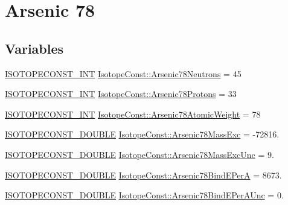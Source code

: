 \hypertarget{group___isotope_const-_arsenic-_as78}{}\section{Arsenic 78}
\label{group___isotope_const-_arsenic-_as78}
\subsection*{Variables}
\begin{DoxyCompactItemize}
\item 
\mbox{\hyperlink{group___isotope_const-_macros_ga5f18360b3e99483a35c32d789e62621c}{I\+S\+O\+T\+O\+P\+E\+C\+O\+N\+S\+T\+\_\+\+I\+NT}} \mbox{\hyperlink{group___isotope_const-_arsenic-_as78_ga1fa1c598ae4bb36c65893069a6392d63}{Isotope\+Const\+::\+Arsenic78\+Neutrons}} = 45
\item 
\mbox{\hyperlink{group___isotope_const-_macros_ga5f18360b3e99483a35c32d789e62621c}{I\+S\+O\+T\+O\+P\+E\+C\+O\+N\+S\+T\+\_\+\+I\+NT}} \mbox{\hyperlink{group___isotope_const-_arsenic-_as78_gaced7bf0f21ca3e2027f5b0cfac0587a2}{Isotope\+Const\+::\+Arsenic78\+Protons}} = 33
\item 
\mbox{\hyperlink{group___isotope_const-_macros_ga5f18360b3e99483a35c32d789e62621c}{I\+S\+O\+T\+O\+P\+E\+C\+O\+N\+S\+T\+\_\+\+I\+NT}} \mbox{\hyperlink{group___isotope_const-_arsenic-_as78_ga1d7dd73cdb37f574b95cb4f34e4418ad}{Isotope\+Const\+::\+Arsenic78\+Atomic\+Weight}} = 78
\item 
\mbox{\hyperlink{group___isotope_const-_macros_ga8f45a7272ce02c0b4c65c44636ed719a}{I\+S\+O\+T\+O\+P\+E\+C\+O\+N\+S\+T\+\_\+\+D\+O\+U\+B\+LE}} \mbox{\hyperlink{group___isotope_const-_arsenic-_as78_ga1612693ce19b2066721253e60006be0a}{Isotope\+Const\+::\+Arsenic78\+Mass\+Exc}} = -\/72816.
\item 
\mbox{\hyperlink{group___isotope_const-_macros_ga8f45a7272ce02c0b4c65c44636ed719a}{I\+S\+O\+T\+O\+P\+E\+C\+O\+N\+S\+T\+\_\+\+D\+O\+U\+B\+LE}} \mbox{\hyperlink{group___isotope_const-_arsenic-_as78_ga7a0dc3287bc9e69d2ee42fe2873f37fb}{Isotope\+Const\+::\+Arsenic78\+Mass\+Exc\+Unc}} = 9.
\item 
\mbox{\hyperlink{group___isotope_const-_macros_ga8f45a7272ce02c0b4c65c44636ed719a}{I\+S\+O\+T\+O\+P\+E\+C\+O\+N\+S\+T\+\_\+\+D\+O\+U\+B\+LE}} \mbox{\hyperlink{group___isotope_const-_arsenic-_as78_ga420401cf25e6c6cd2606d391486ec237}{Isotope\+Const\+::\+Arsenic78\+Bind\+E\+PerA}} = 8673.
\item 
\mbox{\hyperlink{group___isotope_const-_macros_ga8f45a7272ce02c0b4c65c44636ed719a}{I\+S\+O\+T\+O\+P\+E\+C\+O\+N\+S\+T\+\_\+\+D\+O\+U\+B\+LE}} \mbox{\hyperlink{group___isotope_const-_arsenic-_as78_gabbf61849d5938d65937c6012ecdb07f5}{Isotope\+Const\+::\+Arsenic78\+Bind\+E\+Per\+A\+Unc}} = 0.

\end{DoxyCompactItemize}

